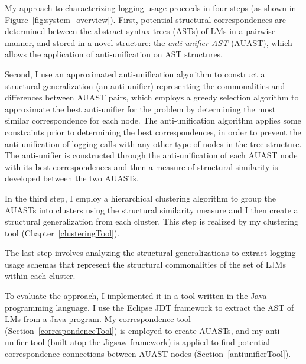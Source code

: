My approach to characterizing logging usage proceeds in four steps (as shown in Figure~\ref{fig:system_overview}). First, potential structural correspondences are determined between the abstract syntax trees (ASTs) of LMs in a pairwise manner, and stored in a novel structure: the \emph{anti-unifier AST} (AUAST), which allows the application of anti-unification on AST structures.

Second, I use an approximated anti-unification algorithm to construct a structural generalization (an anti-unifier) representing the commonalities and differences between AUAST pairs, which employs a greedy selection algorithm to approximate the best anti-unifier for the problem by determining the most similar correspondence for each node. The anti-unification algorithm applies some constraints prior to determining the best correspondences, in order to prevent the anti-unification of logging calls with any other type of nodes in the tree structure. The anti-unifier is constructed through the anti-unification of each AUAST node with its best correspondences and then a measure of structural similarity is developed between the two AUASTs. 

In the third step, I employ a hierarchical clustering algorithm to group the AUASTs into clusters using the structural similarity measure and I then create a structural generalization from each cluster. This step is realized by my clustering tool (Chapter~\ref{clusteringTool}).

The last step involves analyzing the structural generalizations to extract logging usage schemas that represent the structural commonalities of the set of LJMs within each cluster.

To evaluate the approach, I implemented it in a tool written in the Java programming language.  I use the Eclipse JDT framework to extract the AST of LMs from a Java program. My correspondence tool (Section~\ref{correspondenceTool}) is employed to create AUASTs, and my anti-unifier tool (built atop the Jigsaw framework) is applied to find potential correspondence connections between AUAST nodes (Section~\ref{antiunifierTool}).


